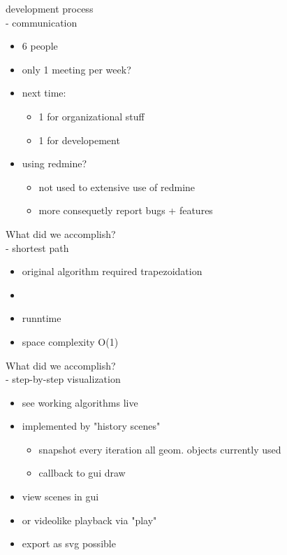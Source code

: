\documentclass[ucs,9ptb]{beamer}
\begin{document}
\begin{frame}{development process\\- communication}
  \begin{itemize}
    \item 6 people
    \item only 1 meeting per week?
    \item next time:
    \begin{itemize}
      \item 1 for organizational stuff
      \item 1 for developement
    \end{itemize}
    \item using redmine?
    \begin{itemize}
      \item not used to extensive use of redmine
      \item more consequetly report bugs + features
    \end{itemize}
  \end{itemize}
\end{frame}

\begin{frame}{What did we accomplish?\\- shortest path}
  \begin{itemize}
    \item original algorithm required trapezoidation
    \item 
    \item runntime
    \item space complexity O(1)
  \end{itemize}
\end{frame}

\begin{frame}{What did we accomplish?\\- step-by-step visualization}
  \begin{itemize}
    \item see working algorithms live
    \item implemented by "history scenes"
    \begin{itemize}
      \item snapshot every iteration 
            all geom. objects currently used
      \item callback to gui draw
    \end{itemize}
    \item view scenes in gui
    \item or videolike playback via "play"
    \item export as svg possible
  \end{itemize}
\end{frame}
\end{document}
